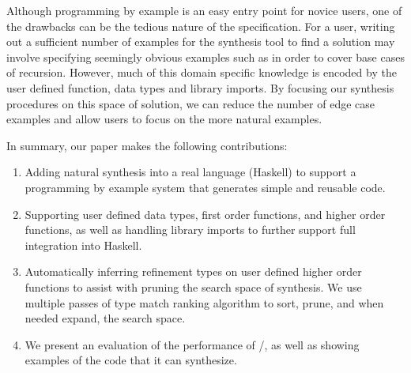 Although programming by example is an easy entry point for novice
users, one of the drawbacks can be the tedious nature of the
specification.  For a user, writing out a sufficient number of
examples for the synthesis tool to find a solution may involve
specifying seemingly obvious examples such as \codeinline{[]->[]} in
order to cover base cases of recursion.  However, much of this domain
specific knowledge is encoded by the user defined function, data types
and library imports.  By focusing our synthesis procedures on this
space of solution, we can reduce the number of edge case examples and
allow users to focus on the more natural examples.

In summary, our paper makes the following contributions:

\begin{enumerate}[topsep=0pt]
\item Adding natural synthesis into a real language (Haskell) to support a programming by example system that generates simple and reusable code.
\item Supporting user defined data types, first order functions, and higher order functions, as well as handling library imports to further support full integration into Haskell.
\item Automatically inferring refinement types on user defined higher order functions to assist with pruning the search space of synthesis. We use multiple passes of type match ranking algorithm to sort, prune, and when needed expand, the search space.
\item We present an evaluation of the performance of \ourTool/, as well as showing examples of the code that it can synthesize.
\end{enumerate}

